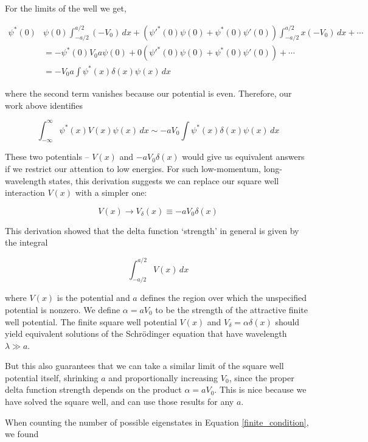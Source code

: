 For the limits of the well we get,  

\begin{align} 
  \psi^*(0) & \psi(0) \int_{-a/2}^{a/2} (-V_0) \, dx + (\psi'^*(0)\psi(0)
  + \psi^*(0)\psi'(0)) \int_{-a/2}^{a/2} x(-V_0) \, dx + \cdots \\
  &= -\psi^*(0)V_0 a\psi(0) + 0(\psi'^*(0)\psi(0)
  + \psi^*(0)\psi'(0)) + \cdots \\ 
  &= -V_0a \int \psi^*(x) \delta(x) \psi(x) \, dx 
\end{align} \vspace{3px}

where the second term vanishes because our potential is even. Therefore, our
work above identifies 

\[
\int_{-\infty}^{\infty} \psi^*(x) V(x) \psi(x) \, dx \sim -a V_0 \int \psi^*(x)
\delta(x) \psi(x) \, dx
\] \vspace{3px}

These two potentials -- $V(x)$ and $-aV_0 \delta(x)$ would give us equivalent
answers if we restrict our attention to low energies. For such low-momentum,
long-wavelength states, this derivation suggests we can replace our square well
interaction $V(x)$ with a simpler one: 

\[
V(x) \rightarrow V_\delta(x) \equiv -aV_0\delta(x)
\] \vspace{3px}


This derivation showed that the delta function `strength' in general is given
by the integral 

\[
\int_{-a/2}^{a/2} V(x) \, dx
\] \vspace{3px}

where $V(x)$ is the potential and $a$ defines the region over which the
unspecified potential is nonzero. We define $\alpha = aV_0$ to be the strength
of the attractive finite well potential. The finite square well potential
$V(x)$ and $V_\delta = \alpha\delta(x)$ should yield equivalent solutions of
the Schr\"odinger equation that have wavelength $\lambda \gg a$. 

But this
also guarantees that we can take a similar limit of the square well potential
itself, shrinking $a$ and proportionally increasing $V_0$, since the proper
delta function strength depends on the product $\alpha = aV_0$. This is nice
because we have solved the square well, and can use those results for any $a$.

When counting the number of possible eigenstates in Equation
\ref{finite_condition}, we found 

